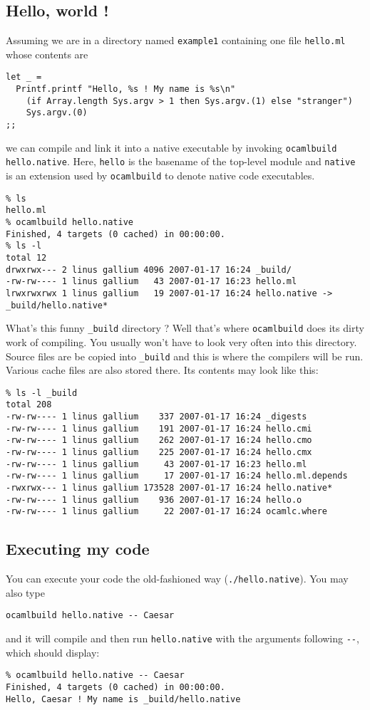 \documentclass[9pt]{article}
\newcommand{\ocb}{\texttt{ocamlbuild}\xspace}
\begin{document}
\subsection{Hello, world !}
Assuming we are in a directory named \texttt{example1} containing one file \texttt{hello.ml}
whose contents are
\begin{verbatim}
let _ =
  Printf.printf "Hello, %s ! My name is %s\n"
    (if Array.length Sys.argv > 1 then Sys.argv.(1) else "stranger")
    Sys.argv.(0)
;;
\end{verbatim}
we can compile and link it into a native executable by invoking \texttt{ocamlbuild hello.native}.
Here, \texttt{hello} is the basename of the top-level module and \texttt{native} is an extension used
by \ocb to denote native code executables.
\begin{verbatim}
% ls
hello.ml
% ocamlbuild hello.native
Finished, 4 targets (0 cached) in 00:00:00.
% ls -l
total 12
drwxrwx--- 2 linus gallium 4096 2007-01-17 16:24 _build/
-rw-rw---- 1 linus gallium   43 2007-01-17 16:23 hello.ml
lrwxrwxrwx 1 linus gallium   19 2007-01-17 16:24 hello.native -> _build/hello.native*
\end{verbatim}
What's this funny \texttt{\_build} directory ?  Well that's where \ocb does its dirty work
of compiling.  You usually won't have to look very often into this directory.  Source files are be copied
into \texttt{\_build} and this is where the compilers will be run.  Various cache files are also stored
there.  Its contents may look like this:
\begin{verbatim}
% ls -l _build
total 208
-rw-rw---- 1 linus gallium    337 2007-01-17 16:24 _digests
-rw-rw---- 1 linus gallium    191 2007-01-17 16:24 hello.cmi
-rw-rw---- 1 linus gallium    262 2007-01-17 16:24 hello.cmo
-rw-rw---- 1 linus gallium    225 2007-01-17 16:24 hello.cmx
-rw-rw---- 1 linus gallium     43 2007-01-17 16:23 hello.ml
-rw-rw---- 1 linus gallium     17 2007-01-17 16:24 hello.ml.depends
-rwxrwx--- 1 linus gallium 173528 2007-01-17 16:24 hello.native*
-rw-rw---- 1 linus gallium    936 2007-01-17 16:24 hello.o
-rw-rw---- 1 linus gallium     22 2007-01-17 16:24 ocamlc.where
\end{verbatim}
\subsection{Executing my code}
You can execute your code the old-fashioned way (\texttt{./hello.native}).
You may also type
\begin{verbatim}
ocamlbuild hello.native -- Caesar
\end{verbatim}
and it will compile and then run \texttt{hello.native} with the arguments following \texttt{-{}-},
which should display:
\begin{verbatim}
% ocamlbuild hello.native -- Caesar
Finished, 4 targets (0 cached) in 00:00:00.
Hello, Caesar ! My name is _build/hello.native
\end{verbatim}
\end{document}
